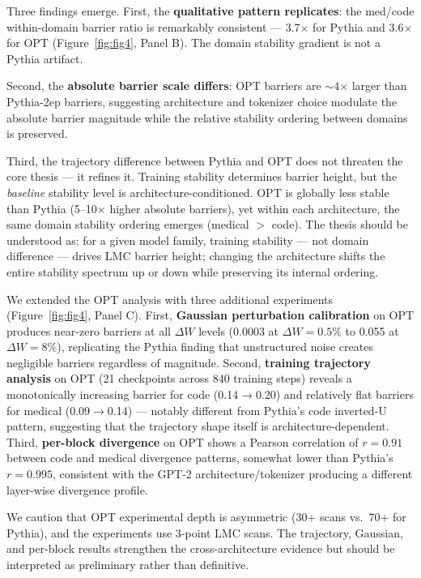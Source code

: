 \documentclass[11pt,a4paper]{article}
\begin{document}
Three findings emerge. First, the \textbf{qualitative pattern replicates}: the med/code within-domain barrier ratio is remarkably consistent — 3.7$\times$ for Pythia and 3.6$\times$ for OPT (Figure~\ref{fig:fig4}, Panel B). The domain stability gradient is not a Pythia artifact.

Second, the \textbf{absolute barrier scale differs}: OPT barriers are $\sim$4$\times$ larger than Pythia-2ep barriers, suggesting architecture and tokenizer choice modulate the absolute barrier magnitude while the relative stability ordering between domains is preserved.

Third, the trajectory difference between Pythia and OPT does not threaten the core thesis — it refines it. Training stability determines barrier height, but the \emph{baseline} stability level is architecture-conditioned. OPT is globally less stable than Pythia (5--10$\times$ higher absolute barriers), yet within each architecture, the same domain stability ordering emerges (medical $>$ code). The thesis should be understood as: for a given model family, training stability — not domain difference — drives LMC barrier height; changing the architecture shifts the entire stability spectrum up or down while preserving its internal ordering.

We extended the OPT analysis with three additional experiments (Figure~\ref{fig:fig4}, Panel C). First, \textbf{Gaussian perturbation calibration} on OPT produces near-zero barriers at all $\Delta W$ levels (0.0003 at $\Delta W=0.5\%$ to 0.055 at $\Delta W=8\%$), replicating the Pythia finding that unstructured noise creates negligible barriers regardless of magnitude. Second, \textbf{training trajectory analysis} on OPT (21 checkpoints across 840 training steps) reveals a monotonically increasing barrier for code (0.14$\to$0.20) and relatively flat barriers for medical (0.09$\to$0.14) — notably different from Pythia's code inverted-U pattern, suggesting that the trajectory shape itself is architecture-dependent. Third, \textbf{per-block divergence} on OPT shows a Pearson correlation of $r=0.91$ between code and medical divergence patterns, somewhat lower than Pythia's $r=0.995$, consistent with the GPT-2 architecture/tokenizer producing a different layer-wise divergence profile.

We caution that OPT experimental depth is asymmetric (30+ scans vs.\ 70+ for Pythia), and the experiments use 3-point LMC scans. The trajectory, Gaussian, and per-block results strengthen the cross-architecture evidence but should be interpreted as preliminary rather than definitive.
\end{document}
